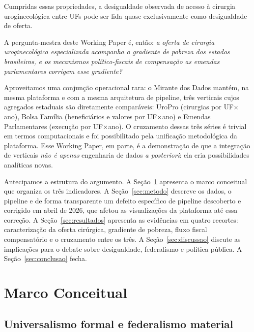 \documentclass[12pt,a4paper,oneside]{article}
\begin{document}
Cumpridas essas propriedades, a desigualdade observada de acesso
à cirurgia uroginecológica entre UFs pode ser lida quase
exclusivamente como desigualdade de oferta.

A pergunta-mestra deste Working Paper é, então: \textit{a oferta
de cirurgia uroginecológica especializada acompanha o gradiente
de pobreza dos estados brasileiros, e os mecanismos
político-fiscais de compensação \textemdash{} as emendas
parlamentares \textemdash{} corrigem esse gradiente?}

Aproveitamos uma conjunção operacional rara: o Mirante dos Dados
mantém, na mesma plataforma e com a mesma arquitetura de pipeline,
três verticais cujos agregados estaduais são diretamente
comparáveis: UroPro (cirurgias por UF$\times$ano), Bolsa Família
(beneficiários e valores por UF$\times$ano) e Emendas Parlamentares
(execução por UF$\times$ano). O cruzamento dessas três séries é
trivial em termos computacionais e foi possibilitado pela
unificação metodológica da plataforma. Esse Working Paper, em
parte, é a demonstração de que a integração de verticais
\textit{não é apenas} engenharia de dados \textit{a posteriori}:
ela cria possibilidades analíticas novas.

Antecipamos a estrutura do argumento. A Seção~\ref{sec:teoria}
apresenta o marco conceitual que organiza os três indicadores.
A Seção~\ref{sec:metodo} descreve os dados, o pipeline e
\textemdash{} de forma transparente \textemdash{} um defeito
específico de pipeline descoberto e corrigido em abril de 2026,
que afetou as visualizações da plataforma até essa correção. A
Seção~\ref{sec:resultados} apresenta as evidências em quatro
recortes: caracterização da oferta cirúrgica, gradiente de
pobreza, fluxo fiscal compensatório e o cruzamento entre os três.
A Seção~\ref{sec:discussao} discute as implicações para o debate
sobre desigualdade, federalismo e política pública. A
Seção~\ref{sec:conclusao} fecha.

\section{Marco Conceitual}\label{sec:teoria}

\subsection{Universalismo formal e federalismo material}
\end{document}
